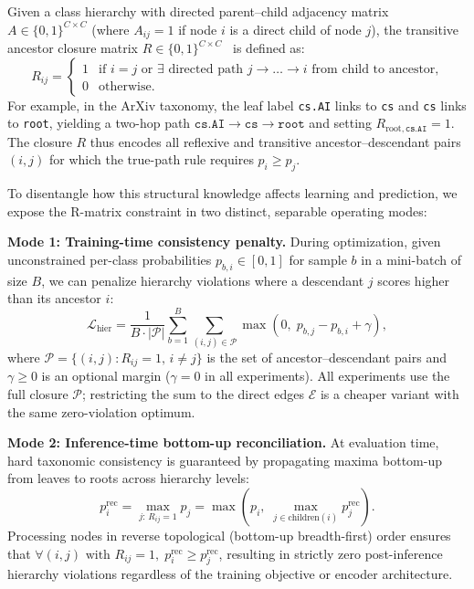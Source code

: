 \documentclass[preprint,12pt]{elsarticle}
\begin{document}
Given a class hierarchy with directed parent--child adjacency matrix $A \in
\{0,1\}^{C \times C}$ (where $A_{ij}=1$ if node $i$ is a direct child of node
$j$), the transitive ancestor closure matrix $R \in \{0,1\}^{C \times C}$~\cite{chmcnn}
is defined as:
\begin{equation}
R_{ij} = \begin{cases}
1 & \text{if } i = j \text{ or } \exists \text{ directed path } j \rightarrow \ldots \rightarrow i \text{ from child to ancestor,} \\
0 & \text{otherwise.}
\end{cases}
\label{eq:rmatrix}
\end{equation}
For example, in the ArXiv taxonomy, the leaf label \texttt{cs.AI} links to
\texttt{cs} and \texttt{cs} links to \texttt{root}, yielding a two-hop path
$\texttt{cs.AI} \rightarrow \texttt{cs} \rightarrow \texttt{root}$ and setting
$R_{\text{root},\,\texttt{cs.AI}} = 1$. The closure $R$ thus encodes all
reflexive and transitive ancestor--descendant pairs $(i,j)$ for which the
true-path rule requires $p_i \geq p_j$.

To disentangle how this structural knowledge affects learning and prediction,
we expose the R-matrix constraint in two distinct, separable operating modes:

\textbf{Mode 1: Training-time consistency penalty.} During optimization, given
unconstrained per-class probabilities $p_{b,i} \in [0,1]$ for sample $b$ in a
mini-batch of size $B$, we can penalize hierarchy violations where a descendant
$j$ scores higher than its ancestor $i$:
\begin{equation}
\mathcal{L}_{\text{hier}} = \frac{1}{B \cdot |\mathcal{P}|}
\sum_{b=1}^{B} \sum_{(i,j) \in \mathcal{P}}
\max\left(0,\; p_{b,j} - p_{b,i} + \gamma\right),
\label{eq:hierloss}
\end{equation}
where $\mathcal{P} = \{(i,j) : R_{ij}=1,\, i \neq j\}$ is the set of
ancestor--descendant pairs and $\gamma \geq 0$ is an optional margin
($\gamma=0$ in all experiments). All experiments use the full closure
$\mathcal{P}$; restricting the sum to the direct edges $\mathcal{E}$ is a
cheaper variant with the same zero-violation optimum.

\textbf{Mode 2: Inference-time bottom-up reconciliation.} At evaluation time,
hard taxonomic consistency is guaranteed by propagating maxima bottom-up from
leaves to roots across hierarchy levels:
\begin{equation}
p_i^{\text{rec}} = \max_{j:\, R_{ij}=1} p_j
= \max\left(p_i,\; \max_{j \in \text{children}(i)} p_j^{\text{rec}}\right).
\label{eq:reconcile}
\end{equation}
Processing nodes in reverse topological (bottom-up breadth-first) order ensures
that $\forall (i,j) \text{ with } R_{ij}=1,\; p_i^{\text{rec}} \geq
p_j^{\text{rec}}$, resulting in strictly zero post-inference hierarchy
violations regardless of the training objective or encoder architecture.
\end{document}
